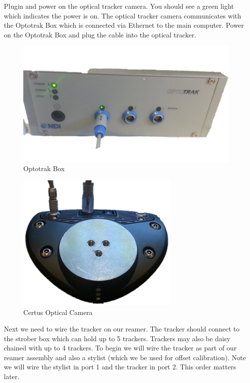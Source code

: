 \documentclass[pdftex,11pt,letterpaper]{article}
\begin{document}
Plugin and power on the optical tracker camera. You should see a green light which indicates the power is on. The optical tracker camera communicates with the Optotrak Box which is connected via Ethernet to the main computer. Power on the Optotrak Box and plug the cable into the optical tracker. \\

\begin{figure}[ht!]
\centering
\includegraphics[width=120mm]{./images/optotrak_box}
\caption{Optotrak Box}
\end{figure}

\begin{figure}[ht!]
\centering
\includegraphics[width=80mm]{./images/ot_camera}
\caption{Certus Optical Camera}
\end{figure}

Next we need to wire the tracker on our reamer. The tracker should connect to the strober box which can hold up to 5 trackers. Trackers may also be daisy chained with up to 4 trackers. To begin we will wire the tracker as part of our reamer assembly and also a stylist (which we be used for offset calibration). Note we will wire the stylist in port 1 and the tracker in port 2. This order matters later. \\
\end{document}

